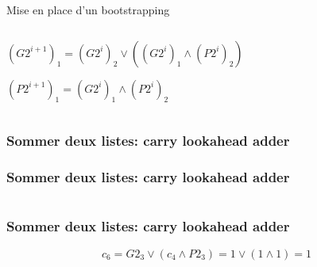 \documentclass[10pt,xcolor={usenames,dvipsnames}]{beamer}
\begin{document}
\begin{section}{Mise en place d'un bootstrapping}
\begin{frame}
\begin{columns}
\begin{column}{0.6\textwidth}
${(G2^{i+1})}_1 = {(G2^i)}_2 \vee \left ( {(G2^i)}_1 \wedge {(P2^i)}_2 \right)$\\

\vspace{0.3cm}

${(P2^{i+1})}_1 = {(G2^i)}_1 \wedge {(P2^i)}_2$

\end{column}
\end{columns}

\end{frame} 


\begin{frame} 
\frametitle{Sommer deux listes: carry lookahead adder}
  \begin{figure}
    \begin{center}
      \begin{tikzpicture}[scale = 0.7, transform shape]
      	
      \end{tikzpicture}
    \end{center}
  \end{figure}
\end{frame} 


\begin{frame} 
\frametitle{Sommer deux listes: carry lookahead adder}
  \begin{figure}
    \begin{center}
      \begin{tikzpicture}[scale = 0.7, transform shape]
      	
      \end{tikzpicture}
    \end{center}
  \end{figure}
\[\quad \]
\[\quad \]
\end{frame} 


\begin{frame} 
\frametitle{Sommer deux listes: carry lookahead adder}
  \begin{figure}
    \begin{center}
      \begin{tikzpicture}[scale = 0.7, transform shape]
      	
      \end{tikzpicture}
    \end{center}
  \end{figure}
\[c_6 = G2_3 \vee \left( c_4 \wedge P2_3\right) = 1 \vee \left( 1 \wedge 1 \right) = 1 \]
\[\quad\]
\end{frame} 


\end{section}
\end{document}

